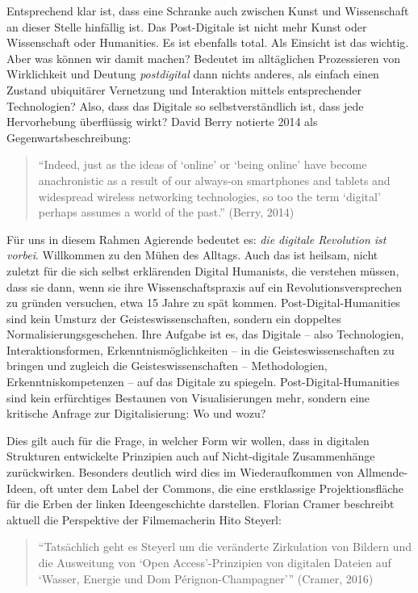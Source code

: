 \documentclass[a4paper,
fontsize=11pt,
oneside,
numbers=noperiodatend,
parskip=half-,
bibliography=totoc,
final
]{scrartcl}
\begin{document}
Entsprechend klar ist, dass eine Schranke auch zwischen Kunst und
Wissenschaft an dieser Stelle hinfällig ist. Das Post-Digitale ist nicht
mehr Kunst oder Wissenschaft oder Humanities. Es ist ebenfalls total.
Als Einsicht ist das wichtig. Aber was können wir damit machen? Bedeutet
im alltäglichen Prozessieren von Wirklichkeit und Deutung
\emph{postdigital} dann nichts anderes, als einfach einen Zustand
ubiquitärer Vernetzung und Interaktion mittels entsprechender
Technologien? Also, dass das Digitale so selbstverständlich ist, dass
jede Hervorhebung überflüssig wirkt? David Berry notierte 2014 als
Gegenwartsbeschreibung:

\begin{quote}
\enquote{Indeed, just as the ideas of \enquote{online} or \enquote{being
online} have become anachronistic as a result of our always-on
smartphones and tablets and widespread wireless networking technologies,
so too the term \enquote{digital} perhaps assumes a world of the past.}
(Berry, 2014)
\end{quote}

Für uns in diesem Rahmen Agierende bedeutet es: \emph{die digitale
Revolution ist vorbei}. Willkommen zu den Mühen des Alltags. Auch das
ist heilsam, nicht zuletzt für die sich selbst erklärenden Digital
Humanists, die verstehen müssen, dass sie dann, wenn sie ihre
Wissenschaftspraxis auf ein Revolutionsversprechen zu gründen versuchen,
etwa 15 Jahre zu spät kommen. Post-Digital-Humanities sind kein Umsturz
der Geisteswissenschaften, sondern ein doppeltes
Normalisierungsgeschehen. Ihre Aufgabe ist es, das Digitale -- also
Technologien, Interaktionsformen, Erkenntnismöglichkeiten -- in die
Geisteswissenschaften zu bringen und zugleich die Geisteswissenschaften
-- Methodologien, Erkenntniskompetenzen -- auf das Digitale zu spiegeln.
Post-Digital-Humanities sind kein erfürchtiges Bestaunen von
Visualisierungen mehr, sondern eine kritische Anfrage zur
Digitalisierung: Wo und wozu?

Dies gilt auch für die Frage, in welcher Form wir wollen, dass in
digitalen Strukturen entwickelte Prinzipien auch auf Nicht-digitale
Zusammenhänge zurückwirken. Besonders deutlich wird dies im
Wiederaufkommen von Allmende-Ideen, oft unter dem Label der Commons, die
eine erstklassige Projektionsfläche für die Erben der linken
Ideengeschichte darstellen. Florian Cramer beschreibt aktuell die
Perspektive der Filmemacherin Hito Steyerl:

\begin{quote}
\enquote{Tatsächlich geht es Steyerl um die veränderte Zirkulation von
Bildern und die Ausweitung von \enquote{Open Access}-Prinzipien von
digitalen Dateien auf \enquote{Wasser, Energie und Dom
Pérignon-Champagner}} (Cramer, 2016)
\end{quote}
\end{document}
